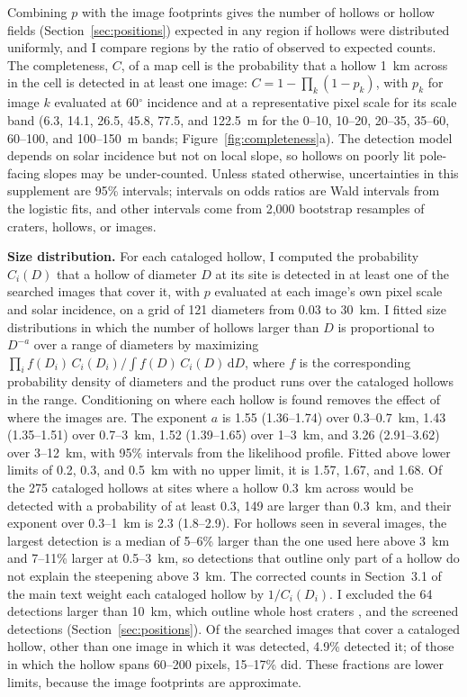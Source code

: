 \documentclass{planetary}
\begin{document}
Combining $p$ with the image footprints gives the number of hollows or hollow fields (Section~\ref{sec:positions}) expected in any region if hollows were distributed uniformly, and I compare regions by the ratio of observed to expected counts. The completeness, $C$, of a map cell is the probability that a hollow 1~km across in the cell is detected in at least one image: $C = 1 - \prod_k (1 - p_k)$, with $p_k$ for image $k$ evaluated at 60$^\circ$ incidence and at a representative pixel scale for its scale band (6.3, 14.1, 26.5, 45.8, 77.5, and 122.5~m for the 0--10, 10--20, 20--35, 35--60, 60--100, and 100--150~m bands; Figure~\ref{fig:completeness}a). The detection model depends on solar incidence but not on local slope, so hollows on poorly lit pole-facing slopes may be under-counted. Unless stated otherwise, uncertainties in this supplement are 95\% intervals; intervals on odds ratios are Wald intervals from the logistic fits, and other intervals come from 2,000 bootstrap resamples of craters, hollows, or images.

\textbf{Size distribution.} For each cataloged hollow, I computed the probability $C_i(D)$ that a hollow of diameter $D$ at its site is detected in at least one of the searched images that cover it, with $p$ evaluated at each image's own pixel scale and solar incidence, on a grid of 121 diameters from 0.03 to 30~km. I fitted size distributions in which the number of hollows larger than $D$ is proportional to $D^{-a}$ over a range of diameters by maximizing $\prod_i f(D_i)\,C_i(D_i) / \int f(D)\,C_i(D)\,\mathrm{d}D$, where $f$ is the corresponding probability density of diameters and the product runs over the cataloged hollows in the range. Conditioning on where each hollow is found removes the effect of where the images are. The exponent $a$ is 1.55 (1.36--1.74) over 0.3--0.7~km, 1.43 (1.35--1.51) over 0.7--3~km, 1.52 (1.39--1.65) over 1--3~km, and 3.26 (2.91--3.62) over 3--12~km, with 95\% intervals from the likelihood profile. Fitted above lower limits of 0.2, 0.3, and 0.5~km with no upper limit, it is 1.57, 1.67, and 1.68. Of the 275 cataloged hollows at sites where a hollow 0.3~km across would be detected with a probability of at least 0.3, 149 are larger than 0.3~km, and their exponent over 0.3--1~km is 2.3 (1.8--2.9). For hollows seen in several images, the largest detection is a median of 5--6\% larger than the one used here above 3~km and 7--11\% larger at 0.5--3~km, so detections that outline only part of a hollow do not explain the steepening above 3~km. The corrected counts in Section~3.1 of the main text weight each cataloged hollow by $1/C_i(D_i)$. I excluded the 64 detections larger than 10~km, which outline whole host craters \parencite{bickel2025}, and the screened detections (Section~\ref{sec:positions}). Of the searched images that cover a cataloged hollow, other than one image in which it was detected, 4.9\% detected it; of those in which the hollow spans 60--200 pixels, 15--17\% did. These fractions are lower limits, because the image footprints are approximate.
\end{document}
